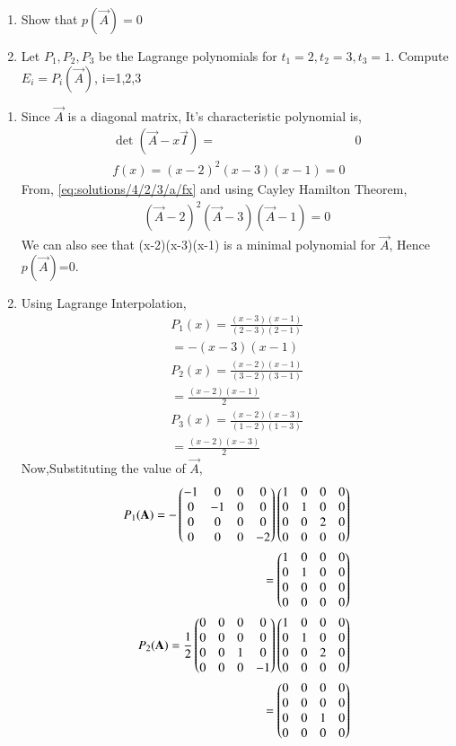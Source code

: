 \begin{enumerate}
\item{Show that $p(\vec{A})=0$}
\item{Let $P_1,P_2,P_3$ be the Lagrange polynomials for $t_1=2, t_2=3,t_3=1$. Compute $E_i=P_i(\vec{A})$, i=1,2,3}
\end{enumerate}
\begin{enumerate}
\item{
Since $\vec{A}$ is a diagonal matrix, It's characteristic polynomial is,
\begin{align}
\det{(\vec{A} - x \vec{I})} =&0\\
f(x)=(x-2)^2(x-3)(x-1)=0\label{eq:solutions/4/2/3/a/fx}
\end{align}
From, \eqref{eq:solutions/4/2/3/a/fx} and using Cayley Hamilton Theorem,
\begin{align}
(\vec{A}-2)^2(\vec{A}-3)(\vec{A}-1)=0
\end{align}
We can also see that (x-2)(x-3)(x-1) is a minimal polynomial for $\vec{A}$, Hence $p(\vec{A})$=0.}
\item{Using Lagrange Interpolation,
\begin{align}
P_1(x)=\frac{(x-3)(x-1)}{(2-3)(2-1)}\\
=-(x-3)(x-1)\\
P_2(x)=\frac{(x-2)(x-1)}{(3-2)(3-1)}\\
=\frac{(x-2)(x-1)}{2}\\
P_3(x)=\frac{(x-2)(x-3)}{(1-2)(1-3)}\\
=\frac{(x-2)(x-3)}{2}
\end{align}
Now,Substituting the value of $\vec{A}$,
\begin{align}
P_1(\vec{A})=-\myvec{-1&0&0&0\\0&-1&0&0\\0&0&0&0\\0&0&0&-2}\myvec{1&0&0&0\\0&1&0&0\\0&0&2&0\\0&0&0&0}\\=\myvec{1&0&0&0\\0&1&0&0\\0&0&0&0\\0&0&0&0}\\
P_2(\vec{A})=\frac{1}{2}\myvec{0&0&0&0\\0&0&0&0\\0&0&1&0\\0&0&0&-1}\myvec{1&0&0&0\\0&1&0&0\\0&0&2&0\\0&0&0&0}\\=\myvec{0&0&0&0\\0&0&0&0\\0&0&1&0\\0&0&0&0}\\

\end{align}}
\end{enumerate}
